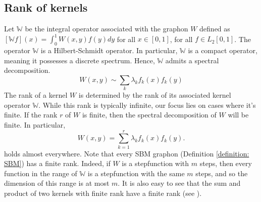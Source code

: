 \documentclass[11pt]{article}
\newcommand{\op}{\mathrm{op}}
\newcommand{\bbW}{\mathbb{W}}
\newcommand{\<}{\langle}
\renewcommand{\>}{\rangle}
\theoremstyle{plain}
\theoremstyle{definition}
\theoremstyle{remark}
\begin{document}
{%



\subsection{Rank of kernels} \label{sec:rank_function}

Let $\bbW$ be the integral operator associated with the graphon $W$ defined as
$[\bbW f](x)= \int_0^1 W(x, y) f(y) dy$ for all $x \in [0,1]$, for all $f \in L_2[0,1]$. 
The operator $\bbW$ is a Hilbert-Schmidt operator. In particular, $\bbW$ is a compact operator, meaning it possesses a discrete spectrum. Hence, $\bbW$ admits a spectral decomposition.
\begin{equation*}
W(x, y) \sim \sum_{k} \lambda_{k} f_{k}(x) f_{k}(y) 
\end{equation*}
The rank of a kernel $W$ is determined by the rank of its associated kernel operator $\bbW$. While this rank is typically infinite, our focus lies on cases where it's finite. 
If the rank $r$ of $W$ is finite, then  the spectral decomposition  of $W$ will be finite. In particular, 
\begin{equation*}
W(x, y)=\sum_{k=1}^{r} \lambda_{k} f_{k}(x) f_{k}(y). 
\end{equation*}
holds almost everywhere. 
Note that every SBM graphon (Definition \ref{definition: SBM}) has a finite rank. Indeed, if $W$ is a stepfunction with $m$ steps, then every function in the range of $\bbW$ is a stepfunction with the same $m$ steps, and so the dimension of this range is at most $m$.
It is also easy to see that the sum and product of
two kernels with finite rank have a finite rank (see \citep[Sections 7.5, 14.4]{lovasz}).



}
\end{document}
